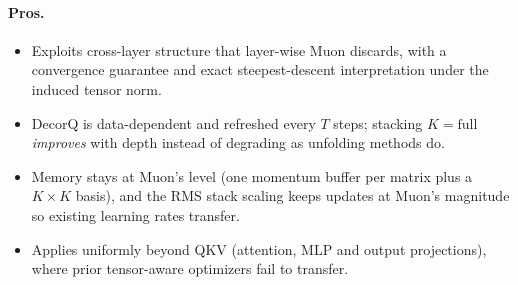 \paragraph{Pros.}
\begin{itemize}[leftmargin=*]
\item Exploits cross-layer structure that layer-wise Muon discards, with a convergence
  guarantee and exact steepest-descent interpretation under the induced tensor norm.
\item DecorQ is data-dependent and refreshed every $T$ steps; stacking $K{=}\mathrm{full}$
  \emph{improves} with depth instead of degrading as unfolding methods do.
\item Memory stays at Muon's level (one momentum buffer per matrix plus a $K \times K$
  basis), and the RMS stack scaling keeps updates at Muon's magnitude so existing
  learning rates transfer.
\item Applies uniformly beyond QKV (attention, MLP and output projections), where prior
  tensor-aware optimizers fail to transfer.
\end{itemize}

